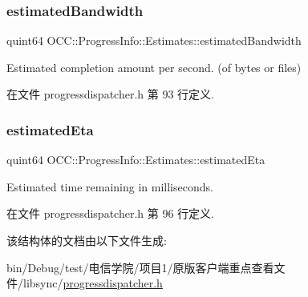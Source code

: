 \subsubsection{\texorpdfstring{estimated\+Bandwidth}{estimatedBandwidth}}
{\footnotesize\ttfamily quint64 O\+C\+C\+::\+Progress\+Info\+::\+Estimates\+::estimated\+Bandwidth}



Estimated completion amount per second. (of bytes or files) 



在文件 progressdispatcher.\+h 第 93 行定义.

\mbox{\label{struct_o_c_c_1_1_progress_info_1_1_estimates_a206645ff6cea68e6e6f24e9162059451}} 
\subsubsection{\texorpdfstring{estimated\+Eta}{estimatedEta}}
{\footnotesize\ttfamily quint64 O\+C\+C\+::\+Progress\+Info\+::\+Estimates\+::estimated\+Eta}



Estimated time remaining in milliseconds. 



在文件 progressdispatcher.\+h 第 96 行定义.



该结构体的文档由以下文件生成\+:\begin{DoxyCompactItemize}
\item 
bin/\+Debug/test/电信学院/项目1/原版客户端重点查看文件/libsync/\hyperlink{progressdispatcher_8h}{progressdispatcher.\+h}\end{DoxyCompactItemize}
